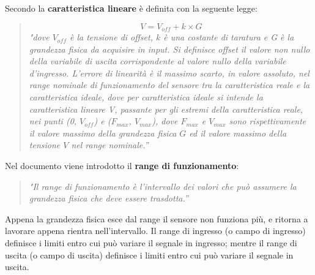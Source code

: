 \documentclass[a4paper]{report} %
\begin{document}
Secondo \cite{art:rif.1} la \textbf{caratteristica lineare} è definita con la seguente legge: 
\begin{quote}
	\begin{equation}
	V = V_{off} + k \times G
	\end{equation}
	\textit{"dove $V_{off}$ è la tensione di offset, $k$ è una costante di taratura e G è la grandezza fisica da acquisire in input. Si definisce offset il valore non nullo della variabile di uscita corrispondente al valore nullo della variabile d'ingresso.
	L'errore di linearità è il massimo scarto, in valore assoluto, nel range nominale di funzionamento del sensore tra la caratteristica reale e la caratteristica ideale, dove per caratteristica ideale si intende la caratteristica lineare V, passante per gli estremi della caratteristica reale, nei punti (0, $V_{off}$) e ($F_{max}$, $V_{max}$), dove $F_{max}$ e $V_{max}$ sono rispettivamente il valore massimo della grandezza fisica $G$ ed il valore massimo della tensione $V$ nel range nominale.''}
\end{quote}

Nel documento \cite{art:rif.11} viene introdotto il \textbf{range di funzionamento}:
\begin{quote}
	\textit{"Il range di funzionamento è l'intervallo dei valori che può assumere la grandezza fisica che deve essere trasdotta.''} 
\end{quote}  	
Appena la grandezza fisica esce dal range il sensore non funziona più, e ritorna a lavorare appena rientra nell'intervallo. Il range di ingresso (o campo di ingresso) definisce i limiti entro cui può variare il segnale in ingresso; mentre il range di uscita (o campo di uscita) definisce i limiti entro cui può variare il segnale in uscita.
 
\end{document}
